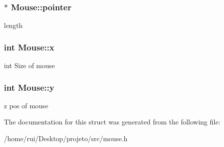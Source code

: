 \subsubsection[{\texorpdfstring{pointer}{pointer}}]{$\ast$ Mouse\+::pointer}\hypertarget{structMouse_ab0790e9d4a70b93662c60313b61ce9b7}{}\label{structMouse_ab0790e9d4a70b93662c60313b61ce9b7}
length 
\subsubsection[{\texorpdfstring{x}{x}}]{\setlength{\rightskip}{0pt plus 5cm}int Mouse\+::x}\hypertarget{structMouse_a136eea114b70f46392b89cc3779d4291}{}\label{structMouse_a136eea114b70f46392b89cc3779d4291}
int Size of mouse 
\subsubsection[{\texorpdfstring{y}{y}}]{\setlength{\rightskip}{0pt plus 5cm}int Mouse\+::y}\hypertarget{structMouse_a4a29b1c18faaa2fbe39ff985ba9d6737}{}\label{structMouse_a4a29b1c18faaa2fbe39ff985ba9d6737}
z pos of mouse 

The documentation for this struct was generated from the following file\+:\begin{DoxyCompactItemize}
\item 
/home/rui/\+Desktop/projeto/src/mouse.\+h\end{DoxyCompactItemize}
